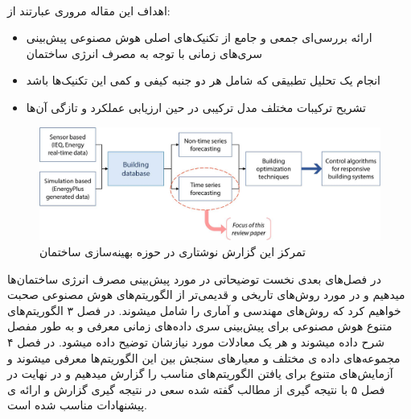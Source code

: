 \\[3em]
\noindent
اهداف این مقاله مروری عبارتند از:
\begin{itemize}
    \item ارائه بررسی‌ای جمعی و جامع از تکنیک‌های اصلی هوش مصنوعی پیش‌بینی سری‌های ‌ز‌‌مانی با توجه به مصرف انرژی ساختمان
    \item انجام یک تحلیل تطبیقی که شامل هر دو جنبه کیفی و کمی این تکنیک‌ها باشد
    \item تشریح ترکیبات مختلف مدل ترکیبی در حین ارزیابی عملکرد و تازگی آن‌ها
\end{itemize}

\begin{figure}[ht!]
    \begin{center}
        \includegraphics[width=14cm]{images/illustration.jpg}
    \end{center}
    \caption[‌اهمیت پیش‌بینی انرژی ساختمان‌ها برای بهینه سازی ساختمان‌ها]{تمرکز این گزارش نوشتاری در حوزه بهینه‌سازی ساختمان
     \cite{DEB2017902}}
    \label{fig:dc}
    \end{figure}

    \noindent
در فصل‌های بعدی نخست توضیحاتی در مورد پیش‌بینی مصرف انرژی ساختمان‌ها میدهیم و در مورد روش‌های تاریخی و قدیمی‌تر از 
الگوریتم‌های هوش‌ مصنوعی صحبت خواهیم کرد که روش‌های مهندسی و آماری را شامل میشوند. در فصل ۳ الگوریتم‌های متنوع هوش مصنوعی برای پیش‌بینی سری داده‌های زمانی معرفی و به طور مفصل شرح داده میشوند و هر یک 
معادلات مورد نیازشان توضیح داده میشود. در فصل ۴ مجموعه‌های داده ی مختلف و معیار‌های سنجش بین این الگوریتم‌ها معرفی میشوند و آزمایش‌های متنوع 
برای یافتن الگوریتم‌های مناسب را گزارش میدهیم و در نهایت در فصل ۵ با نتیجه گیری از مطالب گفته شده سعی در نتیجه گیری گزارش و ارائه ی پیشنهادات مناسب شده است.